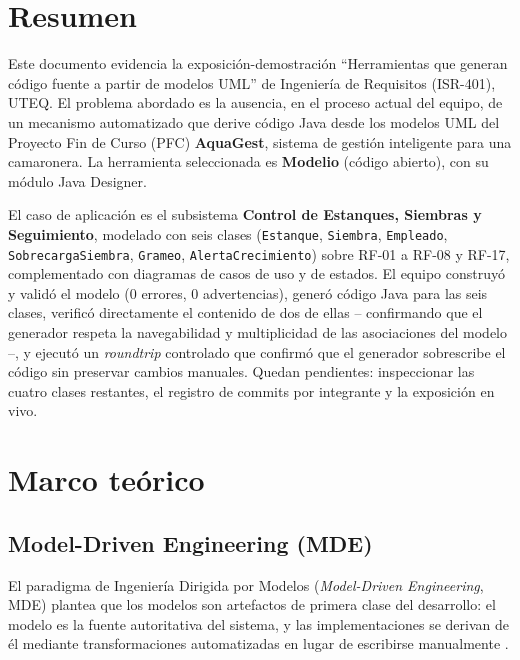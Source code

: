 \documentclass[11pt,a4paper]{article}
\begin{document}
\newpage


\tableofcontents
\newpage

\section*{Resumen}

Este documento evidencia la exposición-demostración ``Herramientas que generan
código fuente a partir de modelos UML'' de Ingeniería de Requisitos (ISR-401),
UTEQ. El problema abordado es la ausencia, en el proceso actual del equipo, de
un mecanismo automatizado que derive código Java desde los modelos UML del
Proyecto Fin de Curso (PFC) \textbf{AquaGest}, sistema de gestión inteligente
para una camaronera. La herramienta seleccionada es \textbf{Modelio} (código
abierto), con su módulo Java Designer.

El caso de aplicación es el subsistema \textbf{Control de Estanques, Siembras y
Seguimiento}, modelado con seis clases (\texttt{Estanque}, \texttt{Siembra},
\texttt{Empleado}, \texttt{SobrecargaSiembra}, \texttt{Grameo},
\texttt{AlertaCrecimiento}) sobre RF-01 a RF-08 y RF-17, complementado con
diagramas de casos de uso y de estados. El equipo construyó y validó el modelo
(0 errores, 0 advertencias), generó código Java para las seis clases, verificó
directamente el contenido de dos de ellas -- confirmando que el generador
respeta la navegabilidad y multiplicidad de las asociaciones del modelo --, y
ejecutó un \textit{roundtrip} controlado que confirmó que el generador
sobrescribe el código sin preservar cambios manuales. Quedan pendientes:
inspeccionar las cuatro clases restantes, el registro de commits por
integrante y la exposición en vivo.





\section{Marco teórico}
\label{sec:marco-teorico}

\subsection{Model-Driven Engineering (MDE)}
El paradigma de Ingeniería Dirigida por Modelos (\textit{Model-Driven Engineering},
MDE) plantea que los modelos son artefactos de primera clase del desarrollo: el
modelo es la fuente autoritativa del sistema, y las implementaciones se derivan de
él mediante transformaciones automatizadas en lugar de escribirse manualmente
\cite{schmidt2006,bucchiarone2020}.
\end{document}
